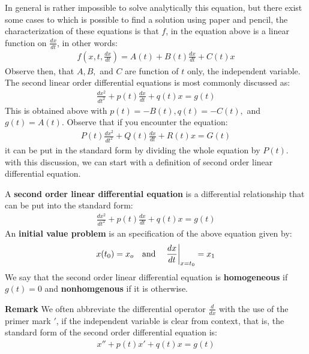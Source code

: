In general is rather impossible to solve analytically this equation, but there exist some cases to which is possible to find a solution using paper and pencil, the characterization of these equations is that $f$, in the equation above is a linear function on $\frac{dx}{dt}$, in other words:
\begin{align*}
f(x,t,\frac{dx}{dt}) = A(t) + B(t)\frac{dx}{dt} + C(t)x
\end{align*}
Observe then, that $A,B,$ and $C$ are function of $t$ only, the independent variable. The second linear order differential equations is most commonly discussed as:
\begin{align*}
\frac{dx^2}{dt^2} + p(t) \frac{dx}{dt} + q(t)x = g(t)
\end{align*}
This is obtained above with $p(t) = -B(t), q(t) = -C(t),$ and $ g(t) = A(t) $.  \newline
Observe that if you encounter the equation:
\begin{align*}
P(t)\frac{dx^2}{dt^2} + Q(t) \frac{dx}{dt} + R(t)x = G(t)
\end{align*}
it can be put in the standard form by dividing the whole equation by $P(t)$. \newline
with this discussion, we can start with a definition of second order linear differential equation.
\begin{define}
	A \textbf{second order linear differential equation} is a differential relationship that can be put into the standard form:
	\begin{align*}
	\frac{dx^2}{dt^2} + p(t) \frac{dx}{dt} + q(t)x = g(t)
	\end{align*} 
	An \textbf{initial value problem} is an specification of the above equation given by:
	\begin{align*}
	x(t_0) = x_o \quad \text{and} \quad \left. \frac{dx}{dt} \right|_{x = t_0} = x_1
	\end{align*}
	We say that the second order linear differential equation is \textbf{homogeneous} if $g(t) = 0 $ and \textbf{nonhomgenous} if it is otherwise.	
\end{define} 
\textbf{Remark} We often abbreviate the differential operator $\frac{d}{dx}$ with the use of the primer mark $'$, if the independent variable is clear from context, that is, the standard form of the second order differential equation is:
\begin{align*}
x'' + p(t)x'+ q(t)x = g(t)
\end{align*}
